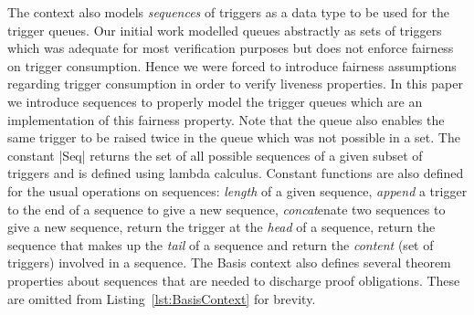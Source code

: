 The context also models \emph{sequences} of triggers as a data type to be used for the trigger queues.
Our initial work modelled queues abstractly as sets of triggers which was adequate for most verification purposes but does not enforce fairness on trigger consumption. 
Hence we were forced to introduce fairness assumptions regarding trigger consumption in order to verify liveness properties.
In this paper we introduce sequences to properly model the trigger queues which are an implementation of this fairness property. 
Note that the queue also enables the same trigger to be raised twice in the queue which was not possible in a set.
The constant |Seq| returns the set of all possible sequences of a given subset of triggers and is defined using lambda calculus.
Constant functions are also defined for the usual operations on sequences: 
\emph{length} of a given sequence, 
\emph{append} a trigger to the end of a sequence to give a new sequence, 
\emph{concat}enate two sequences to give a new sequence, 
return the trigger at the \emph{head} of a sequence, 
return the sequence that makes up the \emph{tail} of a sequence and 
return the \emph{content} (set of triggers) involved in a sequence. 
The Basis context also defines several theorem properties about sequences that are needed to discharge proof obligations.
These are omitted from Listing~\ref{lst:BasisContext} for brevity.

\newcommand*{\Comment}[1]{\color{green!50!black}\hfill\makebox[0.6\textwidth][l]{#1}}%

